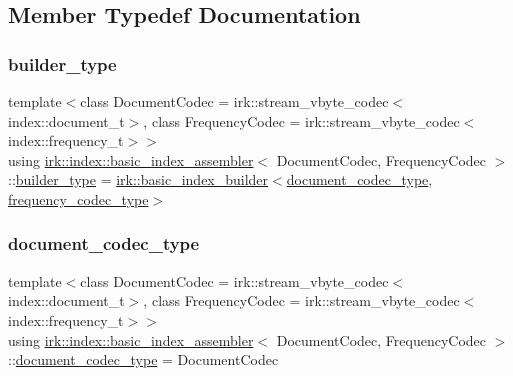 \subsection{Member Typedef Documentation}
\mbox{\label{classirk_1_1index_1_1basic__index__assembler_a2487a04584addbc8e6809cffae653176}} 
\subsubsection{\texorpdfstring{builder\+\_\+type}{builder\_type}}
{\footnotesize\ttfamily template$<$class Document\+Codec  = irk\+::stream\+\_\+vbyte\+\_\+codec$<$index\+::document\+\_\+t$>$, class Frequency\+Codec  = irk\+::stream\+\_\+vbyte\+\_\+codec$<$index\+::frequency\+\_\+t$>$$>$ \\
using \mbox{\hyperlink{classirk_1_1index_1_1basic__index__assembler}{irk\+::index\+::basic\+\_\+index\+\_\+assembler}}$<$ Document\+Codec, Frequency\+Codec $>$\+::\mbox{\hyperlink{classirk_1_1index_1_1basic__index__assembler_a2487a04584addbc8e6809cffae653176}{builder\+\_\+type}} =  \mbox{\hyperlink{classirk_1_1basic__index__builder}{irk\+::basic\+\_\+index\+\_\+builder}}$<$\mbox{\hyperlink{classirk_1_1index_1_1basic__index__assembler_ac64a6ddbef809f5c8b6eafffa9c8130d}{document\+\_\+codec\+\_\+type}}, \mbox{\hyperlink{classirk_1_1index_1_1basic__index__assembler_a2a415182287d7c48e7c6bf8d0c70a06f}{frequency\+\_\+codec\+\_\+type}}$>$}

\mbox{\label{classirk_1_1index_1_1basic__index__assembler_ac64a6ddbef809f5c8b6eafffa9c8130d}} 
\subsubsection{\texorpdfstring{document\+\_\+codec\+\_\+type}{document\_codec\_type}}
{\footnotesize\ttfamily template$<$class Document\+Codec  = irk\+::stream\+\_\+vbyte\+\_\+codec$<$index\+::document\+\_\+t$>$, class Frequency\+Codec  = irk\+::stream\+\_\+vbyte\+\_\+codec$<$index\+::frequency\+\_\+t$>$$>$ \\
using \mbox{\hyperlink{classirk_1_1index_1_1basic__index__assembler}{irk\+::index\+::basic\+\_\+index\+\_\+assembler}}$<$ Document\+Codec, Frequency\+Codec $>$\+::\mbox{\hyperlink{classirk_1_1index_1_1basic__index__assembler_ac64a6ddbef809f5c8b6eafffa9c8130d}{document\+\_\+codec\+\_\+type}} =  Document\+Codec}

